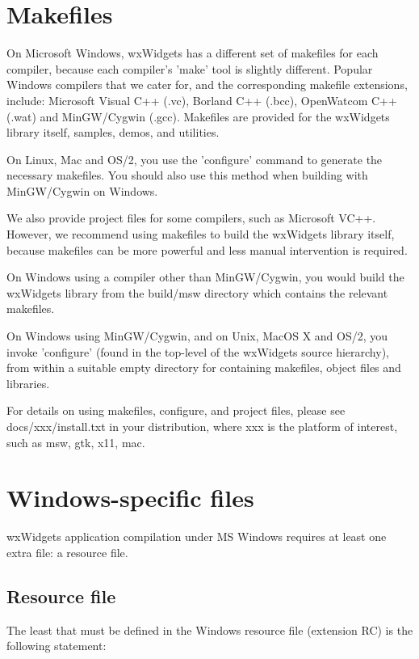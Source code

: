 \section{Makefiles}\label{makefiles}

On Microsoft Windows, wxWidgets has a different set of makefiles for each
compiler, because each compiler's 'make' tool is slightly different.
Popular Windows compilers that we cater for, and the corresponding makefile
extensions, include: Microsoft Visual C++ (.vc), Borland C++ (.bcc),
OpenWatcom C++ (.wat) and MinGW/Cygwin (.gcc). Makefiles are provided
for the wxWidgets library itself, samples, demos, and utilities.

On Linux, Mac and OS/2, you use the 'configure' command to
generate the necessary makefiles. You should also use this method when
building with MinGW/Cygwin on Windows.

We also provide project files for some compilers, such as
Microsoft VC++. However, we recommend using makefiles
to build the wxWidgets library itself, because makefiles
can be more powerful and less manual intervention is required.

On Windows using a compiler other than MinGW/Cygwin, you would
build the wxWidgets library from the build/msw directory
which contains the relevant makefiles.

On Windows using MinGW/Cygwin, and on Unix, MacOS X and OS/2, you invoke
'configure' (found in the top-level of the wxWidgets source hierarchy),
from within a suitable empty directory for containing makefiles, object files and
libraries.

For details on using makefiles, configure, and project files,
please see docs/xxx/install.txt in your distribution, where
xxx is the platform of interest, such as msw, gtk, x11, mac.

\section{Windows-specific files}\label{windowsfiles}

wxWidgets application compilation under MS Windows requires at least one
extra file: a resource file.

\subsection{Resource file}\label{resources}

The least that must be defined in the Windows resource file (extension RC)
is the following statement:

